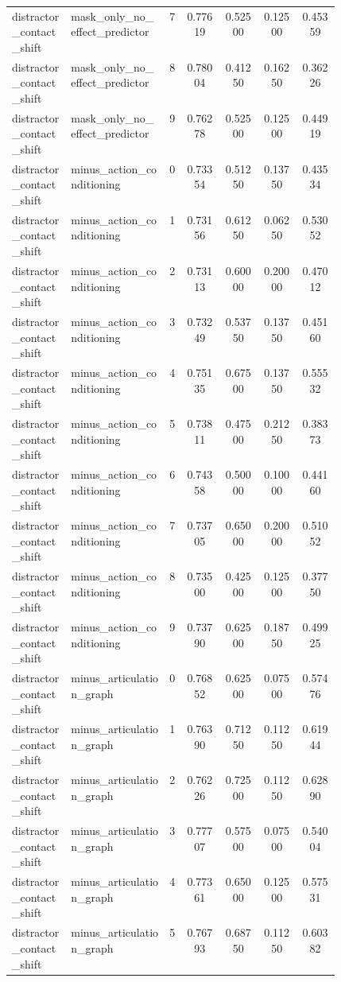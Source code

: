 \documentclass{article}
\begin{document}
\begin{center}
\begin{longtable}{p{0.18\linewidth}p{0.30\linewidth}ccccc}
distractor\_contact\_shift & mask\_only\_no\_effect\_predictor & 7 & 0.77619 & 0.52500 & 0.12500 & 0.45359\\
distractor\_contact\_shift & mask\_only\_no\_effect\_predictor & 8 & 0.78004 & 0.41250 & 0.16250 & 0.36226\\
distractor\_contact\_shift & mask\_only\_no\_effect\_predictor & 9 & 0.76278 & 0.52500 & 0.12500 & 0.44919\\
distractor\_contact\_shift & minus\_action\_conditioning & 0 & 0.73354 & 0.51250 & 0.13750 & 0.43534\\
distractor\_contact\_shift & minus\_action\_conditioning & 1 & 0.73156 & 0.61250 & 0.06250 & 0.53052\\
distractor\_contact\_shift & minus\_action\_conditioning & 2 & 0.73113 & 0.60000 & 0.20000 & 0.47012\\
distractor\_contact\_shift & minus\_action\_conditioning & 3 & 0.73249 & 0.53750 & 0.13750 & 0.45160\\
distractor\_contact\_shift & minus\_action\_conditioning & 4 & 0.75135 & 0.67500 & 0.13750 & 0.55532\\
distractor\_contact\_shift & minus\_action\_conditioning & 5 & 0.73811 & 0.47500 & 0.21250 & 0.38373\\
distractor\_contact\_shift & minus\_action\_conditioning & 6 & 0.74358 & 0.50000 & 0.10000 & 0.44160\\
distractor\_contact\_shift & minus\_action\_conditioning & 7 & 0.73705 & 0.65000 & 0.20000 & 0.51052\\
distractor\_contact\_shift & minus\_action\_conditioning & 8 & 0.73500 & 0.42500 & 0.12500 & 0.37750\\
distractor\_contact\_shift & minus\_action\_conditioning & 9 & 0.73790 & 0.62500 & 0.18750 & 0.49925\\
distractor\_contact\_shift & minus\_articulation\_graph & 0 & 0.76852 & 0.62500 & 0.07500 & 0.57476\\
distractor\_contact\_shift & minus\_articulation\_graph & 1 & 0.76390 & 0.71250 & 0.11250 & 0.61944\\
distractor\_contact\_shift & minus\_articulation\_graph & 2 & 0.76226 & 0.72500 & 0.11250 & 0.62890\\
distractor\_contact\_shift & minus\_articulation\_graph & 3 & 0.77707 & 0.57500 & 0.07500 & 0.54004\\
distractor\_contact\_shift & minus\_articulation\_graph & 4 & 0.77361 & 0.65000 & 0.12500 & 0.57531\\
distractor\_contact\_shift & minus\_articulation\_graph & 5 & 0.76793 & 0.68750 & 0.11250 & 0.60382\\

\end{longtable}
\end{center}
\end{document}
